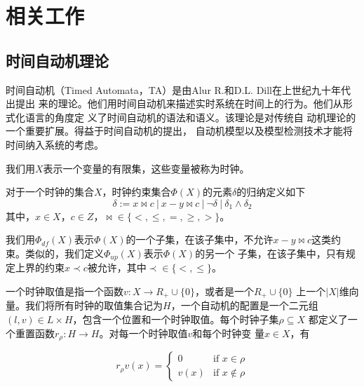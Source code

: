 
\chapter{相关工作}
\label{cha:related_work}

\section{时间自动机理论}
\label{sec:TA}

时间自动机（Timed Automata，TA）是由Alur R.和D.L. Dill在上世纪九十年代出提出
来的理论。他们用时间自动机来描述实时系统在时间上的行为。他们从形式化语言的角度定
义了时间自动机的语法和语义\cite{Alur:1994:TTA:180782.180519}。该理论是对传统自
动机理论\cite{Hopcroft:2006:IAT:1196416}的一个重要扩展。得益于时间自动机的提出，
自动机模型以及模型检测技术\cite{Clarke:2000:MC:332656}才能将时间纳入系统的考虑。

我们用$X$表示一个变量的有限集，这些变量被称为时钟。
\begin{definition}
	\label{def:constraint}
	对于一个时钟的集合$X$，时钟约束集合$\varPhi(X)$的元素$\delta$的归纳定义如下
	\begin{equation}
		\delta := x \bowtie c ~|~ x-y \bowtie c~|~ \neg\delta ~|~ \delta_1 
		\wedge \delta_2
	\end{equation}
	其中，$x\in X$，$c\in Z$，$\bowtie\in \{<,\leq,=,\geq,>\}$。
\end{definition}
我们用$\varPhi_{df}(X)$表示$\varPhi(X)$的一个子集，在该子集中，不允许$x-y 
\bowtie c$这类约束。类似的，我们定义$\varPhi_{up}(X)$表示$\varPhi(X)$的另一个
子集，在该子集中，只有规定上界的约束$x\prec c$被允许，其中$\prec \in \{<,\leq\}$。

一个时钟取值是指一个函数$v:X\longrightarrow R_+\cup\{0\}$，或者是一个$R_+\cup\{0\}$
上一个$|X|$维向量。我们将所有时钟的取值集合记为$H$，一个自动机的配置是一个二元组
$(l,v)\in L\times H$，包含一个位置和一个时钟取值。每个时钟子集$\rho\subseteq X$
都定义了一个重置函数$r_\rho:H\longrightarrow H$。对每一个时钟取值$v$和每个时钟变
量$x\in X$，有

\begin{equation}
	r_\rho v(x)=
	\begin{cases}
		0 & \mbox{if~$x\in \rho$}\\
		v(x) & \mbox{if~$x\notin \rho$}
	\end{cases}
\end{equation}

